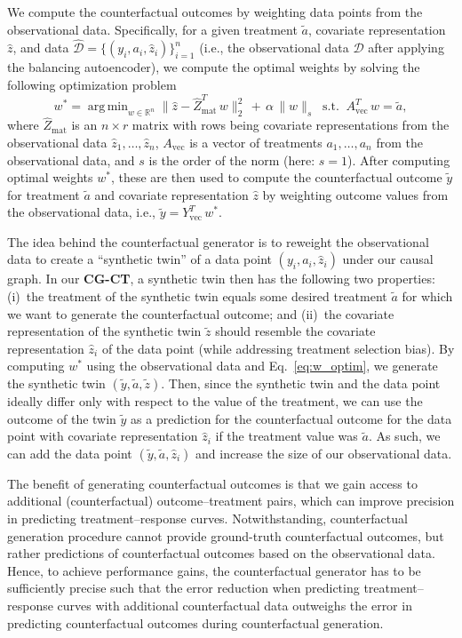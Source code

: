 \documentclass[sigconf]{acmart}
\DeclareMathOperator*{\argmin}{arg\,min} %
\newcommand{\framework}{\textbf{\mbox{CG-CT}}\xspace}
\begin{document}
We compute the counterfactual outcomes by weighting data points from the observational data. Specifically, for a given treatment $\tilde{a}$, covariate representation $\hat{z}$, and data $\hat{\mathcal{D}} =  \{(y_i, a_i, \hat{z}_i)\}_{i=1}^{n}$ (i.e., the observational data $\mathcal{D}$ after applying the balancing autoencoder), we compute the optimal weights by solving the following optimization problem
\begin{equation}
\label{eq:w_optim}
w^*  = \argmin_{ w \in \mathbb{R}^{n}}  \big\| \hat{z} - \hat{Z}_{\mathrm{mat}}^T \, w {\big\|}_2^2  \, + \, \alpha \, \| w {\|}_s \;\; 
 \mathrm{s.t.} \;\; A_{\mathrm{vec}}^T \, w = \tilde{a}  ,   
\end{equation}
where $\hat{Z}_{\mathrm{mat}}$ is an $n \times r$ matrix with rows being covariate representations from the observational data $\hat{z}_1, \ldots, \hat{z}_n$,  $A_{\mathrm{vec}}$ is a vector of treatments $a_1, \ldots, a_n$ from the observational data, and $s$ is the order of the norm (here: $s=1$). After computing optimal weights $w^*$, these are then used to compute the counterfactual outcome $\tilde{y}$ for treatment $\tilde{a}$ and covariate representation $\hat{z}$ by weighting outcome values from the observational data, i.e., $\tilde{y} = Y_{\mathrm{vec}}^T \, w^*$. 

The idea behind the counterfactual generator is to reweight the observational data to create a ``synthetic twin'' of a data point $(y_i,a_i,\hat{z}_i)$ under our causal graph. In our \framework, a synthetic twin then has the following two properties: (i)~the treatment of the synthetic twin equals some desired treatment $\tilde{a}$ for which we want to generate the counterfactual outcome; and (ii)~the covariate representation of the synthetic twin $\tilde{z}$ should resemble the covariate representation $\hat{z}_i$ of the data point (while addressing treatment selection bias). By computing $w^*$ using the observational data and Eq.~\eqref{eq:w_optim}, we generate the synthetic twin $(\tilde{y}, \tilde{a}, \tilde{z})$. Then, since the synthetic twin and the data point ideally differ only with respect to the value of the treatment, we can use the outcome of the twin $\tilde{y}$ as a prediction for the counterfactual outcome for the data point with covariate representation $\hat{z}_i$ if the treatment value was $\tilde{a}$. As such, we can add the data point $(\tilde{y}, \tilde{a}, \hat{z}_i)$ and increase the size of our observational data. 

The benefit of generating counterfactual outcomes is that we gain access to additional (counterfactual) outcome--treatment pairs, which can improve precision in predicting treatment--response curves. Notwithstanding, counterfactual generation procedure cannot provide ground-truth counterfactual outcomes, but rather predictions of counterfactual outcomes based on the observational data. Hence, to achieve performance gains, the counterfactual generator has to be sufficiently precise such that the error reduction when predicting treatment--response curves with additional counterfactual data outweighs the error in predicting counterfactual outcomes during counterfactual generation. 
\end{document}
